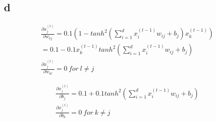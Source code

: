 \subsection*{d}

\begin{gather*}
\frac{\partial x_j^{(t)}}{\partial w_{kj}} = 0.1(1 - tanh^2(\sum_{i=1}^d x_i^{(t-1)} w_{ij} + b_j) x_k^{(t-1)}) \\
= 0.1 - 0.1 x_k^{(t-1)} tanh^2(\sum_{i=1}^d x_i^{(t-1)} w_{ij} + b_j) \\
\frac{\partial x_j^{(t)}}{\partial w_{kl}} = 0 \ for \ l \neq j
\end{gather*}

\begin{gather*}
\frac{\partial x_j^{(t)}}{\partial b_j} = 0.1 + 0.1 tanh^2(\sum_{i=1}^d x_i^{(t-1)} w_{ij} + b_j) \\
\frac{\partial x_j^{(t)}}{\partial b_k} = 0 \ for \ k \neq j
\end{gather*}



